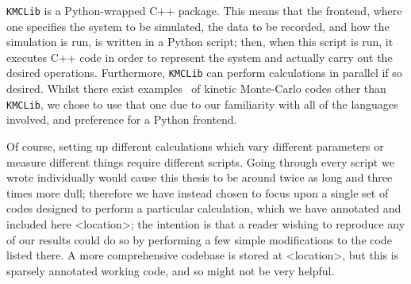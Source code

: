 \texttt{KMCLib} is a Python-wrapped C++ package. This means that the frontend, where one specifies the
system to be simulated, the data to be recorded, and how the simulation is run, is written in a Python
script; then, when this script is run, it executes C++ code in order to represent the system and
actually carry out the desired operations. Furthermore, \texttt{KMCLib} can perform calculations in
parallel if so desired. Whilst there exist examples~\cite{hoffmann2014kmos, spparks} of kinetic
Monte-Carlo codes other than \texttt{KMCLib}, we chose to use that one due to our familiarity with all
of the languages involved, and preference for a Python frontend.

Of course, setting up different calculations which vary different parameters or measure different things
require different scripts. Going through every script we wrote individually would cause this thesis
to be around twice as long and three times more dull; therefore we have instead chosen to focus
upon a single set of codes designed to perform a particular calculation, which we have annotated and 
included here <location>; the intention is that a reader wishing to reproduce any of our results could do
so by performing a few simple modifications to the code listed there. A more comprehensive codebase is
stored at <location>, but this is sparsely annotated working code, and so might not be very helpful.

